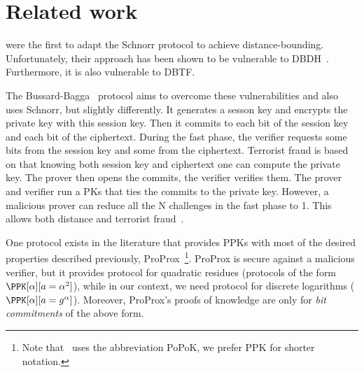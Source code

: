 \section{Related work}%
\label{related-work}

\textcite{DistanceBounding} were the first to adapt the Schnorr
protocol to achieve distance-bounding.
Unfortunately, their approach has been shown to be vulnerable to 
\ac{DBDH}~\cite{DistanceBounding,TamarinDB}.
Furthermore, it is also vulnerable to \ac{DBTF}.

The Bussard-Bagga~\cite{BussardBagga} protocol aims to overcome these
vulnerabilities and also uses Schnorr, but slightly
differently. It generates a sesson key and encrypts the private key
with this session key. Then it commits to each bit of the session key
and each bit of the ciphertext. During the fast phase, the verifier requests some bits from the session key and some from the ciphertext. Terrorist fraud is based on that knowing both session key and ciphertext one can compute the private key.
The prover then opens the commits, the verifier verifies them.
The prover and verifier run a \acp{PK} that ties the commits to the private key.
However, a malicious prover can reduce all the N challenges in the fast phase
to 1. This allows both distance and terrorist
fraud~\cite{Bussard-Bagga-attack}.

One protocol exists in the literature that provides \acp{PPK} with most of the desired properties described previously, ProProx~\cite{ProProx}\footnote{Note that~\cite{ProProx} uses the abbreviation PoPoK, we prefer \acs{PPK} for shorter notation.}.
ProProx is secure against a malicious verifier, but it provides  
protocol for quadratic residues (\ie protocols of the form \(
  \PPK[\alpha][a = \alpha^2]
\)), while in our context, we need  protocol for discrete logarithms 
(\ie \(\PPK[\alpha][a = g^\alpha]\)). %
Moreover, ProProx's proofs of knowledge are only for \emph{bit commitments} of the 
above form. %

